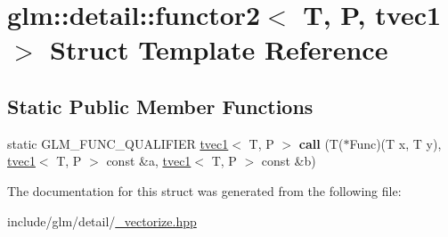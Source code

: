 \hypertarget{structglm_1_1detail_1_1functor2_3_01T_00_01P_00_01tvec1_01_4}{}\section{glm\+:\+:detail\+:\+:functor2$<$ T, P, tvec1 $>$ Struct Template Reference}
\label{structglm_1_1detail_1_1functor2_3_01T_00_01P_00_01tvec1_01_4}
\subsection*{Static Public Member Functions}
\begin{DoxyCompactItemize}
\item 
\mbox{\label{structglm_1_1detail_1_1functor2_3_01T_00_01P_00_01tvec1_01_4_a7f805874487ee439ec9f5ca600f1813d}} 
static G\+L\+M\+\_\+\+F\+U\+N\+C\+\_\+\+Q\+U\+A\+L\+I\+F\+I\+ER \hyperlink{structglm_1_1tvec1}{tvec1}$<$ T, P $>$ {\bfseries call} (T($\ast$Func)(T x, T y), \hyperlink{structglm_1_1tvec1}{tvec1}$<$ T, P $>$ const \&a, \hyperlink{structglm_1_1tvec1}{tvec1}$<$ T, P $>$ const \&b)
\end{DoxyCompactItemize}


The documentation for this struct was generated from the following file\+:\begin{DoxyCompactItemize}
\item 
include/glm/detail/\hyperlink{__vectorize_8hpp}{\+\_\+vectorize.\+hpp}\end{DoxyCompactItemize}
